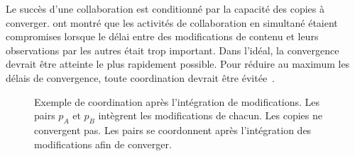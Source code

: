 
Le succès d'une collaboration est conditionné par la capacité des copies à converger.
\textcite{ignat_2015_user-and-delay} ont montré que les activités de collaboration en simultané étaient compromises lorsque le délai entre des modifications de contenu et leurs observations par les autres était trop important.
Dans l'idéal, la convergence devrait être atteinte le plus rapidement possible.
Pour réduire au maximum les délais de convergence, toute coordination devrait être évitée~\autocite{bailis_coordavoidance_2014}.

\begin{figure}[htb]
\newcommand*\hsep{1.7}
\newcommand*\vsep{-1.4}
\centering
{}
\caption[Réplication optimiste et coordination]{Exemple de coordination après l'intégration de modifications.
Les pairs $p_A$ et $p_B$ intègrent les modifications de chacun.
Les copies ne convergent pas.
Les pairs se coordonnent après l'intégration des modifications afin de converger.}\label{fig:convergence-post-coord}
\end{figure}


